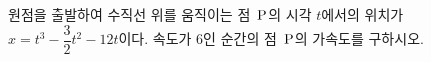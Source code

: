 원점을 출발하여 수직선 위를 움직이는 점~$\mathrm{P}$의 시각 $t$에서의 위치가 $x=t^3-\dfrac{3}{2}t^2-12t$이다. 속도가 $6$인 순간의 점~$\mathrm{P}$의 가속도를 구하시오.
